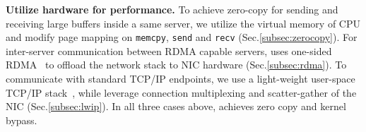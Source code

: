 \textbf{Utilize hardware for performance.}
To achieve zero-copy for sending and receiving large buffers inside a same server, we utilize the virtual memory of CPU and modify page mapping on \texttt{memcpy}, \texttt{send} and \texttt{recv} (Sec.\ref{subsec:zerocopy}). For inter-server communication between RDMA capable servers, \libipc{} uses one-sided RDMA~\cite{mitchell2013using,kaminsky2016design} to offload the network stack to NIC hardware (Sec.\ref{subsec:rdma}). To communicate with standard TCP/IP endpoints, we use a light-weight user-space TCP/IP stack~\cite{dunkels2001design}, while leverage connection multiplexing and scatter-gather of the NIC (Sec.\ref{subsec:lwip}). In all three cases above, \libipc{} achieves zero copy and kernel bypass. %





